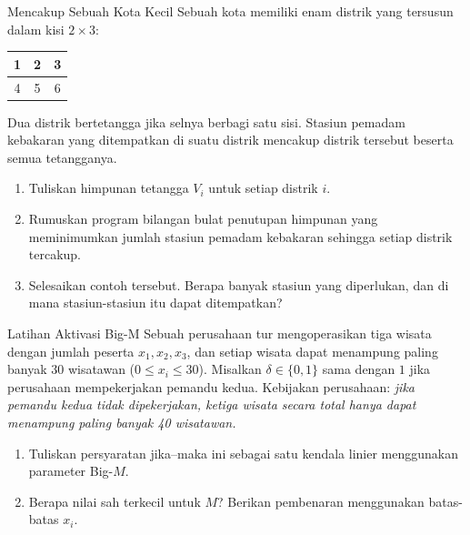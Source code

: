 \begin{ex}{Mencakup Sebuah Kota Kecil}{}
\label{ex:fire-warmup}
 Sebuah kota memiliki enam distrik yang tersusun dalam kisi $2 \times 3$:
\begin{center}
\begin{tabular}{|c|c|c|}
\hline
1 & 2 & 3 \\
\hline
4 & 5 & 6 \\
\hline
\end{tabular}
\end{center}
Dua distrik bertetangga jika selnya berbagi satu sisi. Stasiun pemadam kebakaran yang ditempatkan di suatu distrik mencakup distrik tersebut beserta semua tetangganya.
\begin{enumerate}
\item Tuliskan himpunan tetangga $V_i$ untuk setiap distrik $i$.
\item Rumuskan program bilangan bulat penutupan himpunan yang meminimumkan jumlah stasiun pemadam kebakaran sehingga setiap distrik tercakup.
\item Selesaikan contoh tersebut. Berapa banyak stasiun yang diperlukan, dan di mana stasiun-stasiun itu dapat ditempatkan?
\end{enumerate}
\end{ex}

\begin{ex}{Latihan Aktivasi Big-M}{}
\label{ex:bigM-drill}
 Sebuah perusahaan tur mengoperasikan tiga wisata dengan jumlah peserta $x_1, x_2, x_3$, dan setiap wisata dapat menampung paling banyak 30 wisatawan ($0 \leq x_i \leq 30$). Misalkan $\delta \in \{0,1\}$ sama dengan $1$ jika perusahaan mempekerjakan pemandu kedua. Kebijakan perusahaan: \emph{jika pemandu kedua tidak dipekerjakan, ketiga wisata secara total hanya dapat menampung paling banyak 40 wisatawan.}
\begin{enumerate}
\item Tuliskan persyaratan jika--maka ini sebagai satu kendala linier menggunakan parameter Big-$M$.
\item Berapa nilai sah terkecil untuk $M$? Berikan pembenaran menggunakan batas-batas $x_i$.
\end{enumerate}
\exrefs{\S\ref{subsec:big-M-activation}, \S\ref{sec:modeling-tricks}}
\end{ex}


